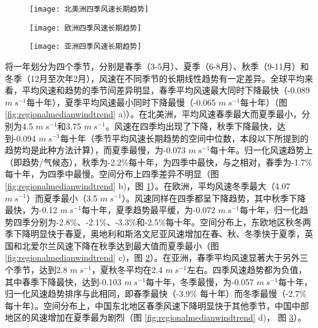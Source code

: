 \begin{figure}[!b]
    \centering
    \texttt{[image: 北美洲四季风速长期趋势]}
    \label{fig:NAwindtrend}
\end{figure}

\begin{figure}[!htbp]
    \centering
    \texttt{[image: 欧洲四季风速长期趋势]}
    \label{fig:EUwindtrend}
\end{figure}

\begin{figure}[!htbp]
    \centering
    \texttt{[image: 亚洲四季风速长期趋势]}
    \label{fig:ASwindtrend}
\end{figure}

将一年划分为四个季节，分别是春季（3-5月）、夏季（6-8月）、秋季（9-11月）和冬季（12月至次年2月），风速在不同季节的长期线性趋势有一定差异。全球平均来看，平均风速和趋势的季节间差异明显，春季平均风速最大同时下降最快（-0.089 $m ~ s^{-1}$每十年），夏季平均风速最小同时下降最慢（-0.065 $m ~ s^{-1}$每十年）（图 \ref{fig:regionalmedianwindtrend} a)）。在北美洲，平均风速春季最大而夏季最小，分别为4.5 $m ~ s^{-1}$和3.75 $m ~ s^{-1}$。风速在四季均出现了下降，秋季下降最快，达到-0.094 $m ~ s^{-1}$每十年（季节平均风速长期趋势的空间中位数，本段以下所提到的趋势均是此种方法计算），而夏季最慢，为-0.073 $m ~ s^{-1}$每十年。归一化风速趋势上（即趋势/气候态），秋季为-2.2\%每十年，为四季中最快，与之相对，春季为-1.7\%每十年，为四季中最慢。空间分布上四季差异不明显（图 \ref{fig:regionalmedianwindtrend} b)，图 \ref{fig:NAwindtrend}）。在欧洲，平均风速冬季最大（4.07 $m ~ s^{-1}$）而夏季最小（3.5 $m ~ s^{-1}$）。风速同样在四季都呈下降趋势，其中秋季下降最快，为-0.12 $m ~ s^{-1}$每十年，夏季趋势最平缓，为-0.072 $m ~ s^{-1}$每十年，归一化趋势四季分别为-2.8\%、-2.1\%、-3.3\%和-2.5\%每十年。空间分布上，东欧地区秋冬两季下降明显快于春夏，奥地利和斯洛文尼亚风速增加在春、秋、冬季快于夏季，英国和北爱尔兰风速下降在秋季达到最大值而夏季最小（图 \ref{fig:regionalmedianwindtrend} c)，图 \ref{fig:EUwindtrend}）。在亚洲，春季平均风速显著大于另外三个季节，达到2.8 $m ~ s^{-1}$，夏秋冬平均在2.4 $m ~ s^{-1}$左右。四季风速趋势都为负值，其中春季下降最快，达到-0.103 $m ~ s^{-1}$每十年，冬季最慢，为-0.057 $m ~ s^{-1}$每十年，归一化风速趋势排序与此相同，即春季最快（-3.9\% 每十年）而冬季最慢（-2.7\% 每十年）。空间分布上，中国东北地区春季风速下降明显快于其他季节，中国中部地区的风速增加在夏季最为剧烈（图 \ref{fig:regionalmedianwindtrend} d)， 图 \ref{fig:ASwindtrend}）。


